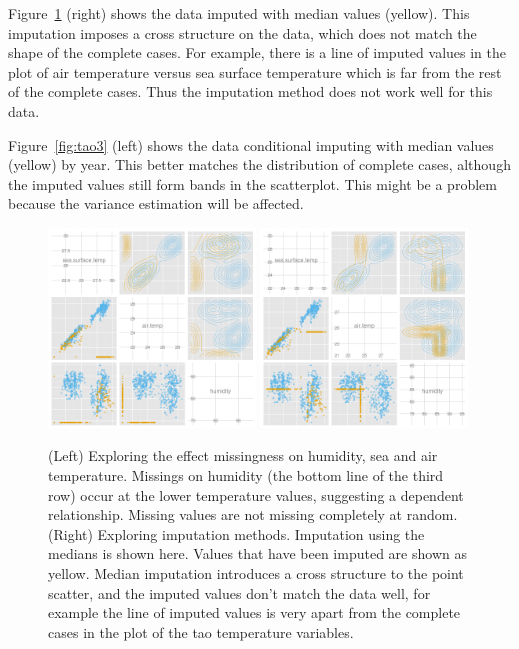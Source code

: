 \documentclass[article]{jss}
\begin{document}
Figure~\ref{fig:tao1} (right) shows the data imputed with median values (yellow). This imputation imposes a cross structure on the data, which does not match the shape of the complete cases. For example, there is a line of imputed values in the plot of air temperature versus sea surface temperature which is far from the rest of the complete cases. Thus the imputation method does not work well for this data.

Figure~\ref{fig:tao3} (left) shows the data conditional imputing with median values (yellow) by year. This better matches the distribution of complete cases, although the imputed values still form bands in the scatterplot. This might be a problem because the variance estimation will be affected. 


\begin{figure}[htp]
\centerline{\includegraphics[width=0.49\textwidth]{graph/fig4-3-below10-uncondition}
\includegraphics[width=0.49\textwidth]{graph/fig4-1-median-uncondition}}
\caption{(Left) Exploring the effect missingness on humidity, sea and air temperature. Missings on humidity (the bottom line of the third row) occur at the lower temperature values, suggesting a dependent relationship. Missing values are not missing completely at random. (Right) Exploring imputation methods. Imputation using the medians is shown here. Values that have been imputed are shown as yellow. Median imputation introduces a cross structure to the point scatter, and the imputed values don't match the data well, for example the line of imputed values is very apart from the complete cases in the plot of the tao temperature variables.}
\label{fig:tao1}
\end{figure}
\end{document}

